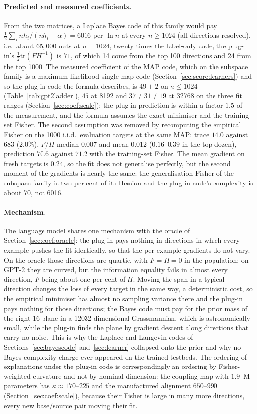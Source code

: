 \documentclass[11pt,a4paper]{article}
\begin{document}
\paragraph{Predicted and measured coefficients.} From the two matrices, a Laplace Bayes code of this family would pay $\tfrac12\sum_i nh_i/(nh_i+\alpha)=6016$ per $\ln n$ at every $n\ge1024$ (all directions resolved), i.e.\ about $65{,}000$ nats at $n=1024$, twenty times the label-only code; the plug-in's $\tfrac12\mathrm{tr}(FH^{-1})$ is $71$, of which 14 come from the top 100 directions and 24 from the top 1000. The measured coefficient of the MAP code, which on the subspace family is a maximum-likelihood single-map code (Section~\ref{sec:score:learners}) and so the plug-in code the formula describes, is $49\pm2$ on $n\le1024$ (Table~\ref{tab:gpt2ladder}), $45$ at 8192 and $37$ / $31$ / $19$ at 32768 on the three fit ranges (Section~\ref{sec:coef:scale}): the plug-in prediction is within a factor $1.5$ of the measurement, and the formula assumes the exact minimiser and the training-set Fisher. The second assumption was removed by recomputing the empirical Fisher on the 1000 i.i.d.\ evaluation targets at the same MAP: trace $14.0$ against $683$ ($2.0\%$), $F/H$ median $0.007$ and mean $0.012$ ($0.16$--$0.39$ in the top dozen), prediction $70.6$ against $71.2$ with the training-set Fisher. The mean gradient on fresh targets is $0.24$, so the fit does not generalise perfectly, but the second moment of the gradients is nearly the same: the generalisation Fisher of the subspace family is two per cent of its Hessian and the plug-in code's complexity is about 70, not 6016.

\paragraph{Mechanism.} The language model shares one mechanism with the oracle of Section~\ref{sec:coef:oracle}: the plug-in pays nothing in directions in which every example pushes the fit identically, so that the per-example gradients do not vary. On the oracle those directions are quartic, with $F=H=0$ in the population; on GPT-2 they are curved, but the information equality fails in almost every direction, $F$ being about one per cent of $H$. Moving the span in a typical direction changes the loss of every target in the same way, a deterministic cost, so the empirical minimiser has almost no sampling variance there and the plug-in pays nothing for those directions; the Bayes code must pay for the prior mass of the right 16-plane in a 12032-dimensional Grassmannian, which is astronomically small, while the plug-in finds the plane by gradient descent along directions that carry no noise. This is why the Laplace and Langevin codes of Sections~\ref{sec:bayescode} and~\ref{sec:learner} collapsed onto the prior and why no Bayes complexity charge ever appeared on the trained testbeds. The ordering of explanations under the plug-in code is correspondingly an ordering by Fisher-weighted curvature and not by nominal dimension: the coupling map with $1.9$~M parameters has $\kappa\approx170$--$225$ and the manufactured alignment $650$--$990$ (Section~\ref{sec:coef:scale}), because their Fisher is large in many more directions, every new base/source pair moving their fit.
\end{document}
